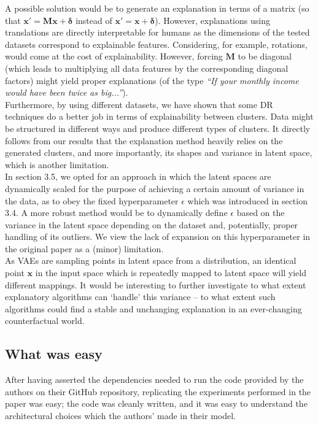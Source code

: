 A possible solution would be to generate an explanation in terms of a matrix (so that $\boldsymbol{x'} = \boldsymbol{Mx} + \boldsymbol{\delta}$ instead of $\boldsymbol{x'} = \boldsymbol{x} + \boldsymbol{\delta}$). However, explanations using translations are directly interpretable for humans as the dimensions of the tested datasets correspond to explainable features. Considering, for example, rotations, would come at the cost of explainability. However, forcing $\boldsymbol{M}$ to be diagonal (which leads to multiplying all data features by the corresponding diagonal factors) might yield proper explanations (of the type \textit{``If your monthly income would have been twice as big...''}).\\

Furthermore, by using different datasets, we have shown that some DR techniques do a better job in terms of explainability between clusters. Data might be structured in different ways and produce different types of clusters. It directly follows from our results that the explanation method heavily relies on the generated clusters, and more importantly, its shapes and variance in latent space, which is another limitation.\\

In section 3.5, we opted for an approach in which the latent spaces are dynamically scaled for the purpose of achieving a certain amount of variance in the data, as to obey the fixed hyperparameter $\epsilon$ which was introduced in section 3.4. A more robust method would be to dynamically define $\epsilon$ based on the variance in the latent space depending on the dataset and, potentially, proper handling of its outliers. We view the lack of expansion on this hyperparameter in the original paper as a (minor) limitation.\\

As VAEs are sampling points in latent space from a distribution, an identical point $\boldsymbol{x}$ in the input space which is repeatedly mapped to latent space will yield different mappings. It would be interesting to further investigate to what extent explanatory algorithms can `handle' this variance -- to what extent such algorithms could find a stable and unchanging explanation in an ever-changing counterfactual world.


\subsection{What was easy}
After having asserted the dependencies needed to run the code provided by the authors on their GitHub repository, replicating the experiments performed in the paper was easy; the code was cleanly written, and it was easy to understand the architectural choices which the authors' made in their model.


